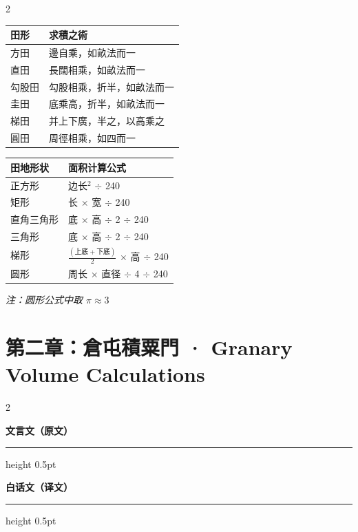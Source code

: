\documentclass[11pt,a4paper]{article}
\newcommand{\classicalheader}{%
  \begin{center}
  \textbf{\textcolor{headerclassical}{\large 文言文（原文）}}
  \end{center}
  \vspace{-0.3em}
  \hrule height 0.5pt \color{classicalborder}
  \vspace{0.5em}
}
\newcommand{\modernheader}{%
  \begin{center}
  \textbf{\textcolor{headermodern}{\large 白话文（译文）}}
  \end{center}
  \vspace{-0.3em}
  \hrule height 0.5pt \color{modernborder}
  \vspace{0.5em}
}
\begin{document}
\begin{paracol}{2}
\begin{leftcolumn}
\begin{center}
\begin{tabular}{ll}
\toprule
\textbf{田形} & \textbf{求積之術} \\
\midrule
方田 & 邊自乘，如畝法而一 \\
直田 & 長闊相乘，如畝法而一 \\
勾股田 & 勾股相乘，折半，如畝法而一 \\
圭田 & 底乘高，折半，如畝法而一 \\
梯田 & 并上下廣，半之，以高乘之 \\
圓田 & 周徑相乘，如四而一 \\
\bottomrule
\end{tabular}
\end{center}
\end{leftcolumn}
\begin{rightcolumn}
\begin{center}
\begin{tabular}{ll}
\toprule
\textbf{田地形状} & \textbf{面积计算公式} \\
\midrule
正方形 & 边长$^2$ $\div$ 240 \\
矩形 & 长 $\times$ 宽 $\div$ 240 \\
直角三角形 & 底 $\times$ 高 $\div$ 2 $\div$ 240 \\
三角形 & 底 $\times$ 高 $\div$ 2 $\div$ 240 \\
梯形 & $\frac{(上底+下底)}{2}$ $\times$ 高 $\div$ 240 \\
圆形 & 周长 $\times$ 直径 $\div$ 4 $\div$ 240 \\
\bottomrule
\end{tabular}
\end{center}
\textit{注：圆形公式中取 $\pi \approx 3$}
\end{rightcolumn}
\end{paracol}

\newpage

\section{第二章：倉屯積粟門 · Granary Volume Calculations}

\begin{paracol}{2}
\begin{leftcolumn}
\classicalheader
\end{leftcolumn}
\begin{rightcolumn}
\modernheader
\end{rightcolumn}
\end{paracol}
\end{document}
